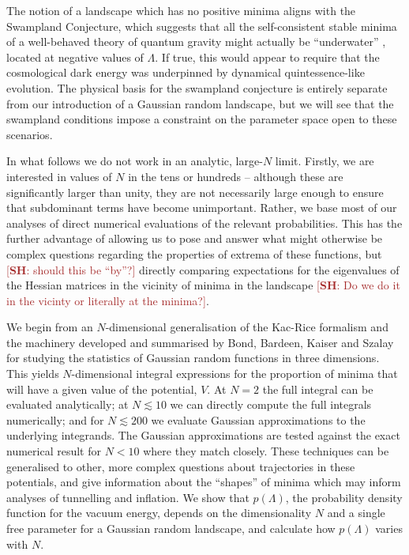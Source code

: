 \documentclass[12pt]{article}
\newcommand{\SH}[1]{\textcolor{brown}{[{\bf SH}: #1]}}
\begin{document}
The notion of a landscape which has no positive minima aligns with the Swampland Conjecture, which suggests that all the self-consistent stable minima of a well-behaved theory of quantum gravity might actually be ``underwater'' \cite{Agrawal2018},  located at negative values of $\Lambda$. If true, this would appear to require that the cosmological dark energy was underpinned by dynamical quintessence-like evolution.  The physical basis for the swampland conjecture is entirely separate from our introduction of a Gaussian random landscape, but we will see that the swampland conditions impose a constraint on the parameter space open to these scenarios.  

In what follows we do not work in an analytic, large-$N$ limit. Firstly, we are interested in values of $N$ in the tens or hundreds -- although these are significantly larger than unity, they are not necessarily large enough to ensure that subdominant terms have become unimportant. Rather, we base most of our analyses of direct numerical evaluations of the relevant probabilities.  This has the further advantage of allowing us to pose and answer what might otherwise be complex questions regarding the properties of extrema of these functions, but \SH{should this be ``by''?} directly comparing expectations for the eigenvalues of the Hessian matrices in the vicinity of minima in the landscape \SH{Do we do it in the vicinty or literally at the minima?}.
 
 We begin from an $N$-dimensional generalisation of the Kac-Rice formalism \cite{Kac1943,Rice1945} and the  machinery developed and summarised by Bond, Bardeen, Kaiser and Szalay  \cite{BBKS} for studying the statistics of Gaussian random functions in three dimensions. This yields $N$-dimensional integral expressions for the proportion of minima that will have a given value of the potential, $V$. At $N=2$ the full integral can be evaluated analytically; at $N \lesssim 10$ we can directly compute the full integrals numerically; and for $N \lesssim 200$ we evaluate Gaussian approximations to the underlying integrands. The Gaussian approximations are tested against the exact numerical result for $N <10$ where they match closely. These techniques can be generalised to other, more complex questions about trajectories in these potentials, and give information about the ``shapes'' of minima which may inform analyses of tunnelling and inflation. We show that $p(\Lambda)$, the probability density function for the vacuum energy, depends on the dimensionality $N$ and a single free parameter for a Gaussian random landscape, and calculate how $p(\Lambda)$ varies with $N$. 
 
\end{document}
